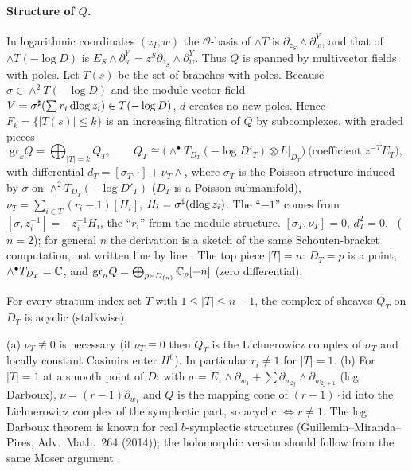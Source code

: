 \paragraph{Structure of $Q$.}
In logarithmic coordinates $(z_I,w)$ the $\mathcal O$-basis of $\wedge T$ is $\partial_{z_S}\wedge\partial_w^Y$, and that of $\wedge T(-\log D)$ is $E_S\wedge\partial_w^Y=z^S\partial_{z_S}\wedge\partial_w^Y$. Thus $Q$ is spanned by multivector fields with poles. Let $T(s)$ be the set of branches with poles. Because $\sigma\in\wedge^2T(-\log D)$ and the module vector field $V=\sigma^\sharp(\sum r_i\,\mathrm{dlog}\, z_i)\in T(-\log D)$, $d$ creates no new poles. Hence $F_k=\{|T(s)|\le k\}$ is an increasing filtration of $Q$ by subcomplexes, with graded pieces
\[\mathrm{gr}_kQ=\bigoplus_{|T|=k}Q_T,\qquad Q_T\cong\bigl(\wedge^\bullet T_{D_T}(-\log D'_T)\otimes L|_{D_T}\bigr)\ \text{(coefficient }z^{-T}E_T\text{)},\]
with differential $d_T=[\sigma_T,\cdot]+\nu_T\wedge$, where $\sigma_T$ is the Poisson structure induced by $\sigma$ on $\wedge^2T_{D_T}(-\log D'_T)$ ($D_T$ is a Poisson submanifold), $\nu_T=\sum_{i\in T}(r_i-1)[H_i]$, $H_i=\sigma^\sharp(\mathrm{dlog}\, z_i)$. The ``$-1$'' comes from $[\sigma,z_i^{-1}]=-z_i^{-1}H_i$, the ``$r_i$'' from the module structure. $[\sigma_T,\nu_T]=0$, $d_T^2=0$. \tP\ ($n=2$); for general $n$ the derivation is a sketch of the same Schouten-bracket computation, not written line by line \tQ.
The top piece $|T|=n$: $D_T=p$ is a point, $\wedge^\bullet T_{D_T}=\mathbb C$, and $\mathrm{gr}_nQ=\bigoplus_{p\in D_{(n)}}\mathbb C_p[-n]$ (zero differential). \tP

\begin{defn}[(GEN$'$)]\label{p4:def:GEN}
For every stratum index set $T$ with $1\le|T|\le n-1$, the complex of sheaves $Q_T$ on $D_T$ is acyclic (stalkwise).
\end{defn}
\begin{prop}\tP\label{p4:prop:genNec}
(a) $\nu_T\not\equiv0$ is necessary (if $\nu_T\equiv0$ then $Q_T$ is the Lichnerowicz complex of $\sigma_T$ and locally constant Casimirs enter $H^0$). In particular $r_i\neq1$ for $|T|=1$.
(b) For $|T|=1$ at a smooth point of $D$: with $\sigma=E_z\wedge\partial_{w_1}+\sum\partial_{w_{2j}}\wedge\partial_{w_{2j+1}}$ (log Darboux), $\nu=(r-1)\partial_{w_1}$ and $Q$ is the mapping cone of $(r-1)\cdot\mathrm{id}$ into the Lichnerowicz complex of the symplectic part, so acyclic $\iff r\neq1$. The log Darboux theorem is known for real $b$-symplectic structures (Guillemin--Miranda--Pires, Adv.\ Math.\ 264 (2014)); the holomorphic version should follow from the same Moser argument \tQ.
\end{prop}

